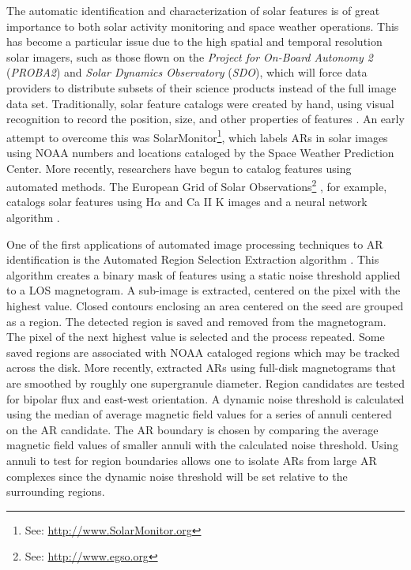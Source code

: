 The automatic identification and characterization of solar features is of great importance to both solar activity monitoring and space weather operations. This has become a particular issue due to the high spatial and temporal resolution solar imagers, such as those flown on the \emph{Project for On-Board Autonomy 2} (\emph{PROBA2}) and \emph{Solar Dynamics Observatory} (\emph{SDO}), which will force data providers to distribute subsets of their science products instead of the full image data set. Traditionally, solar feature catalogs were created by hand, using visual recognition to record the position, size, and other properties of features \citep[e.g.,][]{Carrington:1854}. An early attempt to overcome this was SolarMonitor\footnote{See: \url{http://www.SolarMonitor.org}}\citep{Gallagher:2002}, which labels \glspl{AR} in solar images using \gls{NOAA} numbers and locations cataloged by the Space Weather Prediction Center.  More recently, researchers have begun to catalog features using automated methods. The European Grid of Solar Observations\footnote{See: \url{http://www.egso.org}}  \citep[EGSO;][]{Bentley:2002}, for example, catalogs solar features using H$\alpha$ and Ca II K images and a neural network algorithm \citep{Zharkova:2005,ZharkovaSchetinin:2005}. 

One of the first applications of automated image processing techniques to \gls{AR} identification is the Automated Region Selection Extraction algorithm \citep{McAteer:2005a}. This algorithm creates a binary mask of features using a static noise threshold applied to a \gls{LOS} magnetogram. A sub-image is extracted, centered on the pixel with the highest value. Closed contours enclosing an area centered on the seed are grouped as a region. The detected region is saved and removed from the magnetogram. The pixel of the next highest value is selected and the process repeated. Some saved regions are associated with \gls{NOAA} cataloged regions which may be tracked across the disk. More recently,  \citet{LaBonte:2007} extracted \glspl{AR} using full-disk magnetograms that are smoothed by roughly one supergranule diameter. Region candidates are tested for bipolar flux and east-west orientation. A dynamic noise threshold is calculated using the median of average magnetic field values for a series of annuli centered on the \gls{AR} candidate. The \gls{AR} boundary is chosen by comparing the average magnetic field values of smaller annuli with the calculated noise threshold. Using annuli to test for region boundaries allows one to isolate \glspl{AR} from large \gls{AR} complexes since the dynamic noise threshold will be set relative to the surrounding regions.

